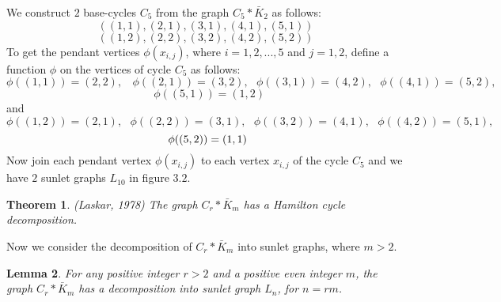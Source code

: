 \documentclass[12pt]{report}
\newtheorem{thm}{Theorem}[section]
\newtheorem{lem}[thm]{Lemma}
\begin{document}
We construct  $2$ base-cycles $C_5$ from the graph
$C_{5}*\bar{K}_{2}$ as follows:
$$((1,1),(2,1),(3,1),(4,1),(5,1))$$
$$((1,2),(2,2),(3,2),(4,2),(5,2))$$
To get the pendant vertices $\phi(x_{i,j})$, where $i=1,2,...,5$ and
$j=1,2$, define a function $\phi$ on the vertices of cycle $C_5$ as
follows:
$$\phi((1,1))=(2,2),\ \ \  \ \phi((2,1))=(3,2),\ \ \  \phi((3,1))=(4,2),\ \ \ \phi((4,1))=(5,2),$$ $$\ \ \ \phi((5,1))=(1,2)$$
and $$\phi((1,2))=(2,1),\ \ \  \phi((2,2))=(3,1),\ \ \
\phi((3,2))=(4,1),\ \ \  \phi((4,2))=(5,1),$$ $$\ \ \\
\phi((5,2))=(1,1)$$ Now join each pendant vertex $\phi(x_{i,j})$ to
each vertex $x_{i,j}$ of the cycle $C_5$ and we have $2$ sunlet
graphs $L_{10}$ in figure $3.2$.
\begin{thm}\label{T:LA1}(Laskar, 1978) %
 The graph $C_r*\bar{K}_m$ has a Hamilton cycle decomposition.
\end{thm}
Now we consider the decomposition of  $C_r*\bar{K}_m$ into sunlet graphs, where $m>2$.
\begin{lem}\label{L:N2}
For any positive integer $r>2$ and a positive even integer $m$, %
the graph $C_r*\bar{K}_m$ has a decomposition into sunlet graph
$L_n$, for $n=rm$.
\end{lem}
\end{document}
